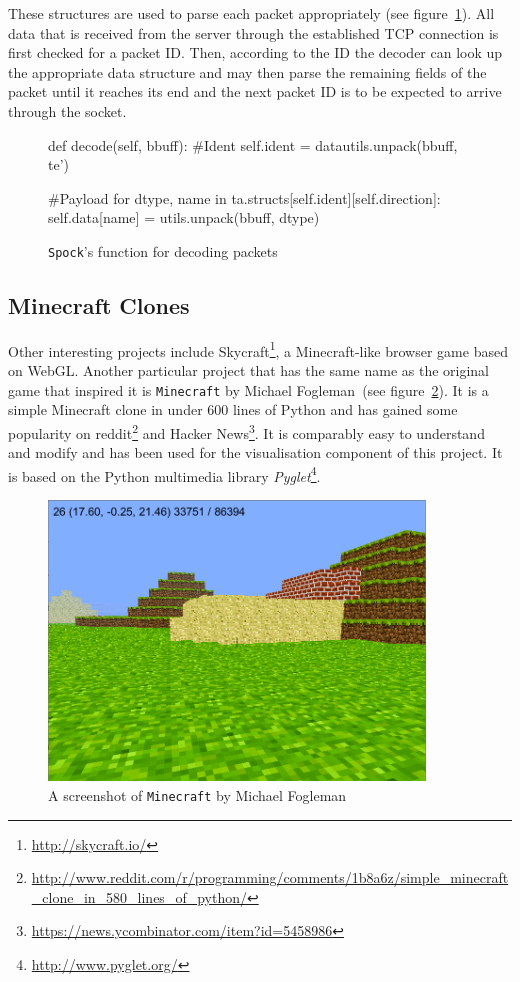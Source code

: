 These structures are used to parse each packet appropriately (see figure~\ref{snippet_parse}). All data that is received from the server through the established TCP connection is first checked for a packet ID. Then, according to the ID the decoder can look up the appropriate data structure and may then parse the remaining fields of the packet until it reaches its end and the next packet ID is to be expected to arrive through the socket.
		\begin{figure}[ht]
			\centering
			\begin{minipage}{13cm}
				\begin{pseudocode}
def decode(self, bbuff):
	#Ident
	self.ident = datautils.unpack(bbuff, te')
	
	#Payload
	for dtype, name in ta.structs[self.ident][self.direction]:
		self.data[name] = utils.unpack(bbuff, dtype)
					\end{pseudocode}
				\caption{\texttt{Spock}'s function for decoding packets}
				\label{snippet_parse}
			\end{minipage}
		\end{figure}
		
		\subsection{Minecraft Clones}
Other interesting projects include Skycraft\footnote{\url{http://skycraft.io/}}, a Minecraft-like browser game based on WebGL. Another particular project that has the same name as the original game that inspired it is \texttt{Minecraft} by Michael Fogleman~(see figure~\ref{fogleman_mc_screen}). It is a simple Minecraft clone in under 600 lines of Python and has gained some popularity on reddit\footnote{\url{http://www.reddit.com/r/programming/comments/1b8a6z/simple_minecraft_clone_in_580_lines_of_python/}} and Hacker News\footnote{\url{https://news.ycombinator.com/item?id=5458986}}. It is comparably easy to understand and modify and has been used for the visualisation component of this project. It is based on the Python multimedia library \emph{Pyglet}\footnote{\url{http://www.pyglet.org/}}.

\begin{figure}[h]
  \centering
    \includegraphics[width=10cm]{graphics/fogleman_mc_screen}
  \caption{A screenshot of \texttt{Minecraft} by Michael Fogleman}
  \label{fogleman_mc_screen}
\end{figure}

